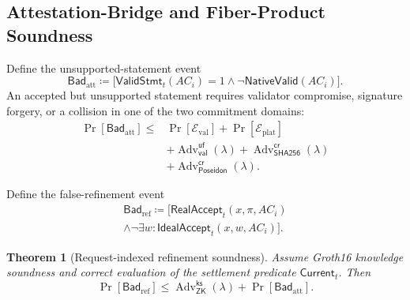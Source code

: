 \documentclass[10pt,journal,compsoc]{IEEEtran}
\newtheorem{theorem}{Theorem}
\begin{document}
\subsection{Attestation-Bridge and Fiber-Product Soundness}
\label{subsec:security_context}

Define the unsupported-statement event
\begin{equation}
\mathsf{Bad}_{\mathrm{att}}\coloneqq
\bigl[\mathsf{ValidStmt}_t(AC_i)=1
\land\neg\mathsf{NativeValid}(AC_i)\bigr].
\label{eq:bad_attestation_event}
\end{equation}
An accepted but unsupported statement requires validator compromise, signature forgery, or a collision in one of the two commitment domains:
\begin{equation}
\begin{aligned}
\Pr[\mathsf{Bad}_{\mathrm{att}}]\leq{}&
\Pr[\mathcal{E}_{\mathrm{val}}]
+\Pr[\mathcal{E}_{\mathrm{plat}}]\\
&+\operatorname{Adv}^{\mathsf{uf}}_{\mathsf{val}}(\lambda)
+\operatorname{Adv}^{\mathsf{cr}}_{\mathsf{SHA256}}(\lambda)\\
&+\operatorname{Adv}^{\mathsf{cr}}_{\mathsf{Poseidon}}(\lambda).
\end{aligned}
\label{eq:attestation_bridge_bound}
\end{equation}

Define the false-refinement event
\begin{equation}
\begin{aligned}
\mathsf{Bad}_{\mathrm{ref}}\coloneqq\bigl[\mathsf{RealAccept}_t(x,\pi,AC_i)
\\
\land\neg\exists w:\mathsf{IdealAccept}_t(x,w,AC_i)\bigr].
\end{aligned}
\label{eq:false_refinement_event}
\end{equation}

\begin{theorem}[Request-indexed refinement soundness]
\label{thm:request_indexed_refinement}
Assume Groth16 knowledge soundness and correct evaluation of the settlement predicate $\mathsf{Current}_t$. Then
\begin{equation}
\Pr[\mathsf{Bad}_{\mathrm{ref}}]
\leq
\operatorname{Adv}^{\mathsf{ks}}_{\mathsf{ZK}}(\lambda)
+
\Pr[\mathsf{Bad}_{\mathrm{att}}].
\label{eq:request_indexed_refinement_bound}
\end{equation}
\end{theorem}
\end{document}
